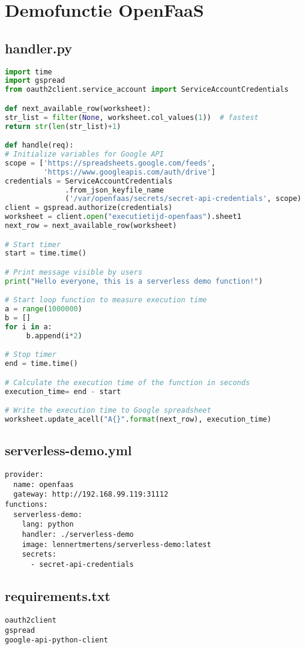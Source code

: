 \newpage
\section{Demofunctie OpenFaaS}
\subsection{handler.py}
\label{sec:demofunctie-openfaas}
\begin{lstlisting}[language=python]
import time
import gspread
from oauth2client.service_account import ServiceAccountCredentials

def next_available_row(worksheet):
str_list = filter(None, worksheet.col_values(1))  # fastest
return str(len(str_list)+1)

def handle(req):   
# Initialize variables for Google API
scope = ['https://spreadsheets.google.com/feeds',
         'https://www.googleapis.com/auth/drive']
credentials = ServiceAccountCredentials
              .from_json_keyfile_name
              ('/var/openfaas/secrets/secret-api-credentials', scope)
client = gspread.authorize(credentials)
worksheet = client.open("executietijd-openfaas").sheet1
next_row = next_available_row(worksheet)

# Start timer 
start = time.time()

# Print message visible by users
print("Hello everyone, this is a serverless demo function!")

# Start loop function to measure execution time
a = range(1000000)
b = []
for i in a:
     b.append(i*2)

# Stop timer
end = time.time()

# Calculate the execution time of the function in seconds
execution_time= end - start

# Write the execution time to Google spreadsheet
worksheet.update_acell("A{}".format(next_row), execution_time)
\end{lstlisting}

\newpage
\subsection{serverless-demo.yml}
\label{sec:serverless-demo.yml}
\begin{lstlisting}
provider:
  name: openfaas
  gateway: http://192.168.99.119:31112
functions:
  serverless-demo:
    lang: python
    handler: ./serverless-demo
    image: lennertmertens/serverless-demo:latest
    secrets:
      - secret-api-credentials
\end{lstlisting}

\subsection{requirements.txt}
\label{sec:requirements.txt}
\begin{lstlisting}
oauth2client
gspread
google-api-python-client
\end{lstlisting}
